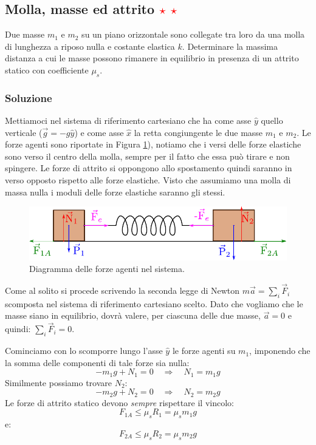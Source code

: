 \documentclass[12pt,a4paper]{book}
\newcommand{\rstar}{ \textcolor{red}{$\star$}}
\begin{document}
\subsection{Molla, masse ed attrito  \rstar \rstar}
Due masse $m_1$ e $m_2$ su un piano orizzontale sono collegate tra loro da una molla di lunghezza a riposo nulla e costante elastica $k$. Determinare la massima distanza a cui le masse possono rimanere in equilibrio in presenza di un attrito statico con coefficiente $\mu_s$.

\subsubsection*{Soluzione}
Mettiamoci nel sistema di riferimento cartesiano che ha come asse $\hat{y}$ quello verticale ($\vec{g}=-g\hat{y}$) e come asse $\hat{x}$ la retta congiungente le due masse $m_1$ e $m_2$. 
Le forze agenti sono riportate in Figura \ref{fig:4-p-5}), notiamo che i versi delle forze elastiche sono verso il centro della molla, sempre per il fatto che essa può tirare e non spingere. Le forze di attrito si oppongono allo spostamento quindi saranno in verso opposto rispetto alle forze elastiche. Visto che assumiamo una molla di massa nulla i moduli delle forze elastiche saranno gli stessi.

\begin{figure}[!ht]
\centering
\includegraphics[scale=1.2]{p-5.pdf}
\caption{Diagramma delle forze agenti nel sistema.\label{fig:4-p-5} }
\end{figure}

Come al solito si procede scrivendo la seconda legge di Newton $m \vec{a} =\sum_i \vec{F}_i$ scomposta nel
sistema di riferimento cartesiano scelto. Dato che vogliamo che le masse siano in equilibrio, dovrà valere, per 
ciascuna delle due masse, $\vec{a}=0$ e quindi: $\sum_i \vec{F}_i=0$. 

Cominciamo con lo scomporre lungo l'asse $\hat{y}$ le forze agenti su $m_1$,
imponendo che la somma delle componenti di tale forze sia nulla: 
\begin{equation*}
-m_1 g + N_1=0 \quad \Longrightarrow \quad N_1=m_1 g
\end{equation*}
Similmente possiamo trovare $N_2$: 
\begin{equation*}
-m_2 g + N_2=0 \quad \Longrightarrow \quad N_2=m_2 g
\end{equation*}
Le forze di attrito statico devono \textit{sempre} rispettare il vincolo:
\begin{equation*}
F_{1A} \leq \mu_s R_1 = \mu_s m_1 g
\end{equation*}
e:
\begin{equation*}
F_{2A} \leq \mu_s R_2 = \mu_s m_2 g
\end{equation*}
\end{document}
